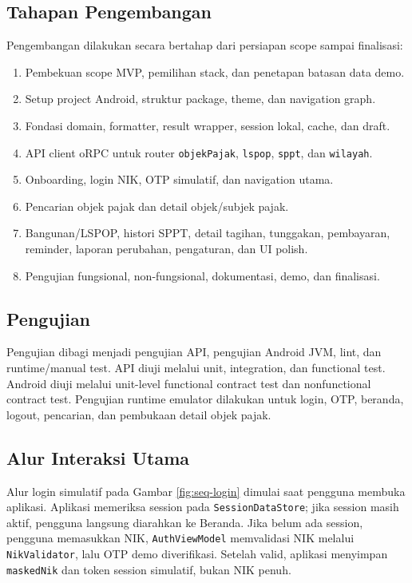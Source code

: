 \documentclass[conference]{report-assets/ref/IEEE-conference-template-062824/IEEEtran}
\begin{document}
\subsection{Tahapan Pengembangan}
Pengembangan dilakukan secara bertahap dari persiapan scope sampai finalisasi:
\begin{enumerate}[leftmargin=*]
\item Pembekuan scope MVP, pemilihan stack, dan penetapan batasan data demo.
\item Setup project Android, struktur package, theme, dan navigation graph.
\item Fondasi domain, formatter, result wrapper, session lokal, cache, dan draft.
\item API client oRPC untuk router \texttt{objekPajak}, \texttt{lspop}, \texttt{sppt}, dan \texttt{wilayah}.
\item Onboarding, login NIK, OTP simulatif, dan navigation utama.
\item Pencarian objek pajak dan detail objek/subjek pajak.
\item Bangunan/LSPOP, histori SPPT, detail tagihan, tunggakan, pembayaran, reminder, laporan perubahan, pengaturan, dan UI polish.
\item Pengujian fungsional, non-fungsional, dokumentasi, demo, dan finalisasi.
\end{enumerate}

\subsection{Pengujian}
Pengujian dibagi menjadi pengujian API, pengujian Android JVM, lint, dan runtime/manual test. API diuji melalui unit, integration, dan functional test. Android diuji melalui unit-level functional contract test dan nonfunctional contract test. Pengujian runtime emulator dilakukan untuk login, OTP, beranda, logout, pencarian, dan pembukaan detail objek pajak.

\subsection{Alur Interaksi Utama}
Alur login simulatif pada Gambar \ref{fig:seq-login} dimulai saat pengguna membuka aplikasi. Aplikasi memeriksa session pada \texttt{SessionDataStore}; jika session masih aktif, pengguna langsung diarahkan ke Beranda. Jika belum ada session, pengguna memasukkan NIK, \texttt{AuthViewModel} memvalidasi NIK melalui \texttt{NikValidator}, lalu OTP demo diverifikasi. Setelah valid, aplikasi menyimpan \texttt{maskedNik} dan token session simulatif, bukan NIK penuh.
\end{document}
